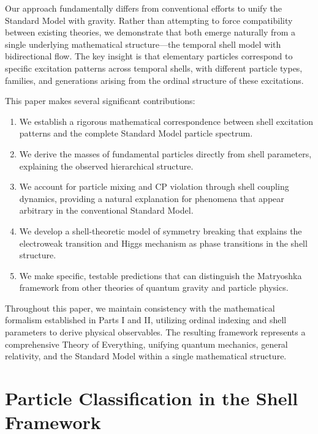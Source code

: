 \documentclass[12pt,a4paper]{article}
\begin{document}
Our approach fundamentally differs from conventional efforts to unify the Standard Model with gravity. Rather than attempting to force compatibility between existing theories, we demonstrate that both emerge naturally from a single underlying mathematical structure—the temporal shell model with bidirectional flow. The key insight is that elementary particles correspond to specific excitation patterns across temporal shells, with different particle types, families, and generations arising from the ordinal structure of these excitations.

This paper makes several significant contributions:

\begin{enumerate}
    \item We establish a rigorous mathematical correspondence between shell excitation patterns and the complete Standard Model particle spectrum.
    
    \item We derive the masses of fundamental particles directly from shell parameters, explaining the observed hierarchical structure.
    
    \item We account for particle mixing and CP violation through shell coupling dynamics, providing a natural explanation for phenomena that appear arbitrary in the conventional Standard Model.
    
    \item We develop a shell-theoretic model of symmetry breaking that explains the electroweak transition and Higgs mechanism as phase transitions in the shell structure.
    
    \item We make specific, testable predictions that can distinguish the Matryoshka framework from other theories of quantum gravity and particle physics.
\end{enumerate}

Throughout this paper, we maintain consistency with the mathematical formalism established in Parts I and II, utilizing ordinal indexing and shell parameters to derive physical observables. The resulting framework represents a comprehensive Theory of Everything, unifying quantum mechanics, general relativity, and the Standard Model within a single mathematical structure.

\section{Particle Classification in the Shell Framework}
\label{sec:particle-classification}
\end{document}
